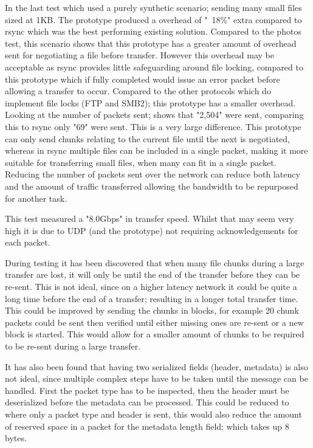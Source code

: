 In the last test which used a purely synthetic scenario; sending many small files sized at 1KB. The prototype produced a overhead of "~18\%" extra compared to rsync which was the best performing existing solution. Compared to the photos test, this scenario shows that this prototype has a greater amount of overhead sent for negotiating a file before transfer. However this overhead may be acceptable as rsync provides little safeguarding around file locking, compared to this prototype which if fully completed would issue an error packet before allowing a transfer to occur. Compared to the other protocols which do implement file locks (FTP and SMB2); this prototype has a smaller overhead. Looking at the number of packets sent; shows that "2,504" were sent, comparing this to rsync only "69" were sent. This is a very large difference. This prototype can only send chunks relating to the current file until the next is negotiated, whereas in rsync multiple files can be included in a single packet, making it more suitable for transferring small files, when many can fit in a single packet. Reducing the number of packets sent over the network can reduce both latency and the amount of traffic transferred allowing the bandwidth to be repurposed for another task.

This test measured a "8.0Gbps" in transfer speed. Whilst that may seem very high it is due to UDP (and the prototype) not requiring acknowledgements for each packet.

During testing it has been discovered that when many file chunks during a large transfer are lost, it will only be until the end of the transfer before they can be re-sent. This is not ideal, since on a higher latency network it could be quite a long time before the end of a transfer; resulting in a longer total transfer time. This could be improved by sending the chunks in blocks, for example 20 chunk packets could be sent then verified until either missing ones are re-sent or a new block is started. This would allow for a smaller amount of chunks to be required to be re-sent during a large transfer.

It has also been found that having two serialized fields (header, metadata) is also not ideal, since multiple complex steps have to be taken until the message can be handled. First the packet type has to be inspected, then the header must be deserialized before the metadata can be processed. This could be reduced to where only a packet type and header is sent, this would also reduce the amount of reserved space in a packet for the metadata length field; which takes up 8 bytes.
